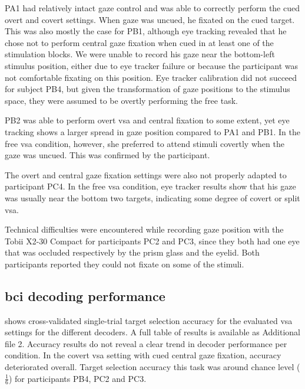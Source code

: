 \documentclass{article}
\begin{document}
PA1 had relatively intact gaze control and was able to correctly perform the
cued overt and covert settings.
When gaze was uncued, he fixated on the cued target.
This was also mostly the case for PB1, although eye tracking revealed that he
chose not to perform central gaze fixation when cued in at least one of the
stimulation blocks. We were unable to record his gaze near the bottom-left
stimulus position, either due to eye tracker failure or because the participant
was not comfortable fixating on this position.
Eye tracker calibration did not succeed for subject PB4, but given the
transformation of gaze positions to the stimulus space, they were assumed to
be overtly performing the free task.

PB2 was able to perform overt \ac{vsa} and central fixation to some extent,
yet eye tracking shows a larger spread in gaze position compared to
PA1 and PB1.
In the free \ac{vsa} condition, however, she preferred to attend
stimuli covertly when the gaze was uncued.
This was confirmed by the participant.

The overt and central gaze fixation settings were also not properly adapted to
participant PC4.
In the free \ac{vsa} condition, eye tracker results show that his gaze was usually near the
bottom two targets, indicating some degree of covert or split \ac{vsa}.

Technical difficulties were encountered while recording gaze position with the
Tobii X2-30
Compact for participants PC2 and PC3, since they both had one eye that was
occluded respectively by the prism glass and the eyelid.
Both participants reported they could not fixate on some of the
stimuli.

\subsection{\Acs{bci} decoding performance}

 shows cross-validated single-trial target selection
accuracy for the evaluated \ac{vsa} settings for the different decoders.
A full table of results is available as Additional file 2.
Accuracy results do not reveal a clear trend in decoder performance per
condition.
In the covert \ac{vsa} setting with cued central gaze fixation, accuracy
deteriorated overall.
Target selection accuracy this task was around chance level ($\frac{1}{6}$) for
participants PB4, PC2 and PC3.
\end{document}
